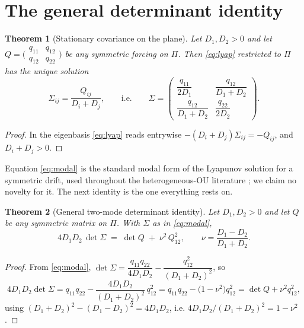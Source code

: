 \documentclass[11pt]{article}
\theoremstyle{plain}
\newtheorem{theorem}{Theorem}
\theoremstyle{definition}
\theoremstyle{remark}
\newcommand{\Sig}{\Sigma}
\begin{document}
\section{The general determinant identity}\label{sec:thm1}

\begin{theorem}[Stationary covariance on the plane]\label{thm:cov}
Let $D_1,D_2>0$ and let $Q=\bigl(\begin{smallmatrix}q_{11}&q_{12}\\ q_{12}&q_{22}\end{smallmatrix}\bigr)$
be any symmetric forcing on $\Pi$. Then \eqref{eq:lyap} restricted to $\Pi$ has the unique
solution
\begin{equation}
  \Sig_{ij}=\frac{Q_{ij}}{D_i+D_j},
  \qquad\text{i.e.}\qquad
  \Sig=\begin{pmatrix}
    \dfrac{q_{11}}{2D_1} & \dfrac{q_{12}}{D_1+D_2}\\[2.2ex]
    \dfrac{q_{12}}{D_1+D_2} & \dfrac{q_{22}}{2D_2}\end{pmatrix}. \label{eq:modal}
\end{equation}
\end{theorem}

\begin{proof}
In the eigenbasis \eqref{eq:lyap} reads entrywise $-(D_i+D_j)\Sig_{ij}=-Q_{ij}$, and
$D_i+D_j>0$.
\end{proof}

Equation \eqref{eq:modal} is the standard modal form of the Lyapunov solution for a symmetric
drift, used throughout the heterogeneous-OU literature
\cite{Barucca2014,GodrecheLuck2019,FerreiraMetzBarucca2025}; we claim no novelty for it. The
next identity is the one everything rests on.

\begin{theorem}[General two-mode determinant identity]\label{thm:sharp}
Let $D_1,D_2>0$ and let $Q$ be any symmetric matrix on $\Pi$. With $\Sig$ as in
\eqref{eq:modal},
\begin{equation}
  4D_1D_2\,\det\Sig \;=\; \det Q \;+\; \nu^2\,Q_{12}^2,
  \qquad \nu=\frac{D_1-D_2}{D_1+D_2}. \label{eq:sharp}
\end{equation}
\end{theorem}

\begin{proof}
From \eqref{eq:modal},
$\det\Sig=\dfrac{q_{11}q_{22}}{4D_1D_2}-\dfrac{q_{12}^2}{(D_1+D_2)^2}$, so
\[
  4D_1D_2\det\Sig
  = q_{11}q_{22}-\frac{4D_1D_2}{(D_1+D_2)^2}\,q_{12}^2
  = q_{11}q_{22}-\bigl(1-\nu^2\bigr)q_{12}^2
  = \det Q+\nu^2q_{12}^2,
\]
using $(D_1+D_2)^2-(D_1-D_2)^2=4D_1D_2$, i.e. $4D_1D_2/(D_1+D_2)^2=1-\nu^2$.
\end{proof}
\end{document}
